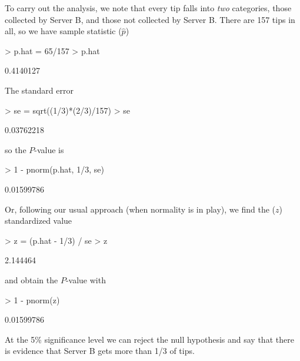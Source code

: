 \documentclass{article}
\begin{document}
\begin{enumerate}
To carry out the analysis, we note that every tip falls into
\textit{two} categories, those collected by Server B, and those
not collected by Server B.  There are 157 tips in all, so we have
sample statistic ($\hat p$)
\begin{Schunk}
\begin{Sinput}
> p.hat = 65/157
> p.hat
\end{Sinput}
\begin{Soutput}
[1] 0.4140127
\end{Soutput}
\end{Schunk}
The standard error
\begin{Schunk}
\begin{Sinput}
> se = sqrt((1/3)*(2/3)/157)
> se
\end{Sinput}
\begin{Soutput}
[1] 0.03762218
\end{Soutput}
\end{Schunk}
so the $P$-value is
\begin{Schunk}
\begin{Sinput}
> 1 - pnorm(p.hat, 1/3, se)
\end{Sinput}
\begin{Soutput}
[1] 0.01599786
\end{Soutput}
\end{Schunk}
Or, following our usual approach (when normality is in play),
we find the ($z$) standardized value
\begin{Schunk}
\begin{Sinput}
> z = (p.hat - 1/3) / se
> z
\end{Sinput}
\begin{Soutput}
[1] 2.144464
\end{Soutput}
\end{Schunk}
and obtain the $P$-value with
\begin{Schunk}
\begin{Sinput}
> 1 - pnorm(z)
\end{Sinput}
\begin{Soutput}
[1] 0.01599786
\end{Soutput}
\end{Schunk}
At the 5\% significance level we can reject the null hypothesis
and say that there is evidence that Server B gets more than 1/3 of tips.

\end{enumerate}
\end{document}
